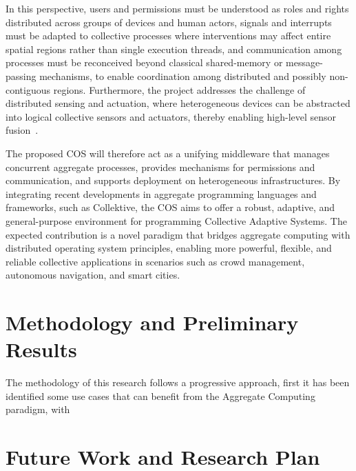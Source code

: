 \documentclass[runningheads]{llncs}
\begin{document}
    In this perspective,
    users and permissions must be understood as roles and rights distributed across groups of devices and human actors,
    signals and interrupts must be adapted to collective processes where interventions may affect entire spatial regions rather than single execution threads,
    and communication among processes must be reconceived beyond classical shared-memory or message-passing mechanisms,
    to enable coordination among distributed and possibly non-contiguous regions.
    Furthermore,
    the project addresses the challenge of distributed sensing and actuation,
    where heterogeneous devices can be abstracted into logical collective sensors and actuators,
    thereby enabling high-level sensor fusion~\cite{DBLP:journals/arc/Sasiadek02}.

    The proposed COS will therefore act as a unifying middleware that manages concurrent aggregate processes,
    provides mechanisms for permissions and communication,
    and supports deployment on heterogeneous infrastructures.
    By integrating recent developments in aggregate programming languages and frameworks,
    such as Collektive, the COS aims to offer a robust, adaptive,
    and general-purpose environment for programming Collective Adaptive Systems.
    The expected contribution is a novel paradigm that bridges aggregate computing with distributed operating system principles,
    enabling more powerful, flexible,
    and reliable collective applications in scenarios such as crowd management, autonomous navigation, and smart cities.

    \section{Methodology and Preliminary Results}\label{sec:methodology}

    The methodology of this research follows a progressive approach,
    first it has been identified some use cases that can benefit from the Aggregate Computing paradigm,
    with



    \section{Future Work and Research Plan}\label{sec:future}
\end{document}
